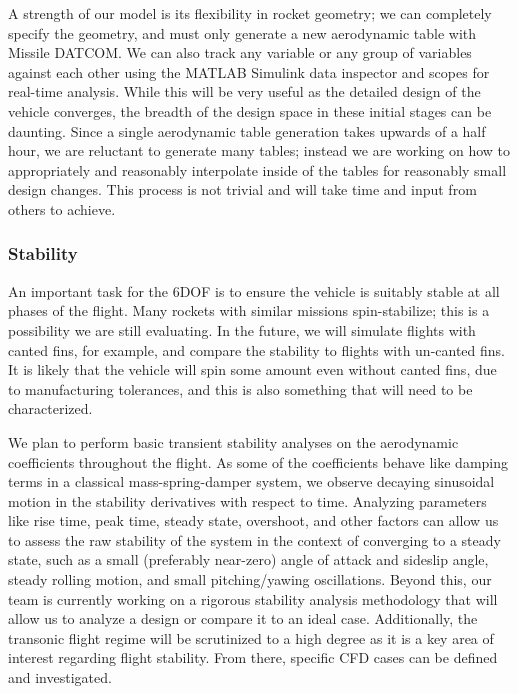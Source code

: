A strength of our model is its flexibility in rocket geometry; we can completely specify the geometry, and must only generate a new aerodynamic table with Missile DATCOM. We can also track any variable or any group of variables against each other using the MATLAB Simulink data inspector and scopes for real-time analysis. While this will be very useful as the detailed design of the vehicle converges, the breadth of the design space in these initial stages can be daunting. Since a single aerodynamic table generation takes upwards of a half hour, we are reluctant to generate many tables; instead we are working on how to appropriately and reasonably interpolate inside of the tables for reasonably small design changes. This process is not trivial and will take time and input from others to achieve.

\subsubsection{Stability}
An important task for the 6DOF is to ensure the vehicle is suitably stable at all phases of the flight. Many rockets with similar missions spin-stabilize; this is a possibility we are still evaluating. In the future, we will simulate flights with canted fins, for example, and compare the stability to flights with un-canted fins. It is likely that the vehicle will spin some amount even without canted fins, due to manufacturing tolerances, and this is also something that will need to be characterized.

We plan to perform basic transient stability analyses on the aerodynamic coefficients throughout the flight.  As some of the coefficients behave like damping terms in a classical mass-spring-damper system, we observe decaying sinusoidal motion in the stability derivatives with respect to time. Analyzing parameters like rise time, peak time, steady state, overshoot, and other factors can allow us to assess the raw stability of the system in the context of converging to a steady state, such as a small (preferably near-zero) angle of attack and sideslip angle, steady rolling motion, and small pitching/yawing oscillations. Beyond this, our team is currently working on a rigorous stability analysis methodology that will allow us to analyze a design or compare it to an ideal case. Additionally, the transonic flight regime will be scrutinized to a high degree as it is a key area of interest regarding flight stability. From there, specific CFD cases can be defined and investigated.


